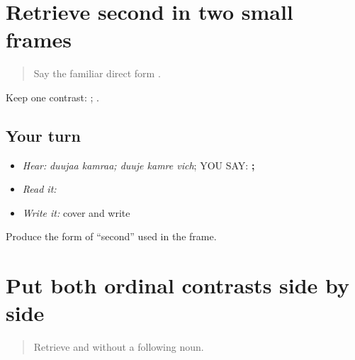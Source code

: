 \section[\texorpdfstring{\pa{ਦੂਜਾ} · \pa{ਦੂਜੇ} (duujaa; duuje)}{ਦੂਜਾ · ਦੂਜੇ (duujaa; duuje)}]{Retrieve second in two small frames}

\label{lesson:PA-C193-duje-review}



\begin{quote}
Say the familiar direct form \textbf{}.
\end{quote}

\begin{grammarlens}[title={Grammar Lens}]
Keep one contrast: \textbf{ }; \textbf{  }.
\end{grammarlens}

\subsection*{Your turn}
\begin{itemize}
\raggedright
  \item \emph{Hear:} \emph{duujaa kamraa; duuje kamre vich}; YOU SAY: \textbf{ ;   }
  \item \emph{Read it:} \textbf{  }
  \item \emph{Write it:} cover and write \textbf{}
\end{itemize}

\begin{tcolorbox}[breakable,colback=teal!4,colframe=teal!35!black,title={Before you move on}]
Produce the form of “second” used in the \textbf{ } frame.
\end{tcolorbox}
\section[\texorpdfstring{\pa{ਪਹਿਲਾ} · \pa{ਪਹਿਲੇ} … (pahilaa; pahile …)}{ਪਹਿਲਾ · ਪਹਿਲੇ … (pahilaa; pahile …)}]{Put both ordinal contrasts side by side}

\label{lesson:PA-C193-ordinal-contrast}



\begin{quote}
Retrieve \textbf{} and \textbf{} without a following noun.
\end{quote}

